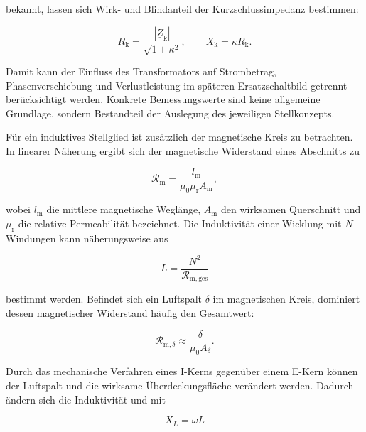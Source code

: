 bekannt, lassen sich Wirk- und Blindanteil der Kurzschlussimpedanz bestimmen:

\begin{equation}
  R_{\mathrm{k}}
  =
  \frac{\left|\underline{Z}_{\mathrm{k}}\right|}
  {\sqrt{1+\kappa^2}},
  \qquad
  X_{\mathrm{k}}
  =
  \kappa R_{\mathrm{k}}.
  \label{eq:rk_xk_transformator}
\end{equation}

Damit kann der Einfluss des Transformators auf Strombetrag,
Phasenverschiebung und Verlustleistung im späteren Ersatzschaltbild getrennt
berücksichtigt werden. Konkrete Bemessungswerte sind keine allgemeine
Grundlage, sondern Bestandteil der Auslegung des jeweiligen Stellkonzepts.

Für ein induktives Stellglied ist zusätzlich der magnetische Kreis zu
betrachten. In linearer Näherung ergibt sich der magnetische Widerstand eines
Abschnitts zu

\begin{equation}
  \mathcal{R}_{\mathrm{m}}
  =
  \frac{l_{\mathrm{m}}}
  {\mu_0\mu_{\mathrm{r}}A_{\mathrm{m}}},
  \label{eq:magnetischer_widerstand}
\end{equation}

wobei \(l_{\mathrm{m}}\) die mittlere magnetische Weglänge,
\(A_{\mathrm{m}}\) den wirksamen Querschnitt und \(\mu_{\mathrm{r}}\) die
relative Permeabilität bezeichnet. Die Induktivität einer Wicklung mit
\(N\) Windungen kann näherungsweise aus

\begin{equation}
  L
  =
  \frac{N^2}{\mathcal{R}_{\mathrm{m,ges}}}
  \label{eq:induktivitaet_magnetischer_kreis}
\end{equation}

bestimmt werden. Befindet sich ein Luftspalt \(\delta\) im magnetischen Kreis,
dominiert dessen magnetischer Widerstand häufig den Gesamtwert:

\begin{equation}
  \mathcal{R}_{\mathrm{m},\delta}
  \approx
  \frac{\delta}{\mu_0A_{\delta}}.
  \label{eq:magnetischer_widerstand_luftspalt}
\end{equation}

Durch das mechanische Verfahren eines I-Kerns gegenüber einem E-Kern können
der Luftspalt und die wirksame Überdeckungsfläche verändert werden. Dadurch
ändern sich die Induktivität und mit

\begin{equation}
  X_{L}
  =
  \omega L
  \label{eq:induktiver_blindwiderstand}
\end{equation}

